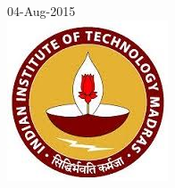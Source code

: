 \documentclass[12pt]{article}
\theoremstyle{plain}
\begin{document}
\begin{titlepage}


{\large 04-Aug-2015}\\ [1cm]%


\includegraphics{iitmlogo2}\\[1cm] %
 

\vfill %

\end{titlepage}

\newpage
{}
\end{document}
